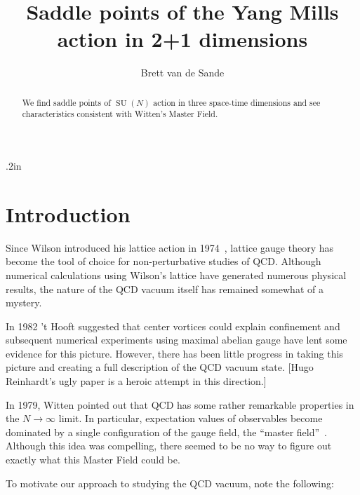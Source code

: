 \documentclass[preprint,aps,prd]{revtex4-2}
\DeclareMathOperator{\SU}{SU}
\begin{document}
\title{Saddle points of the Yang Mills action in 2+1 dimensions}


\author{Brett van de Sande}
\noaffiliation

\begin{abstract}
  We find saddle points of $\SU(N)$ action in three space-time dimensions
  and see characteristics consistent with Witten's Master Field.
\end{abstract}

\maketitle

\baselineskip .2in

\section{Introduction}
\label{intro}

Since Wilson introduced his lattice action in 1974~\cite{wilson_confinement_1974},
lattice gauge theory has become the tool of choice for
non-perturbative studies of QCD.  Although numerical
calculations using Wilson's lattice have generated numerous
physical results, the nature of the QCD vacuum itself
has remained somewhat of a mystery.

In 1982 't Hooft suggested that center vortices could
explain confinement and subsequent numerical experiments
using maximal abelian gauge have lent some evidence for this
picture.  However, there has been little progress in taking
this picture and creating a full description of the
QCD vacuum state.  [Hugo Reinhardt's ugly paper is a
  heroic attempt in this direction.]

In 1979, Witten pointed out that QCD has some rather remarkable
properties in the $N \to \infty$ limit.  In particular,
expectation values of observables become dominated by a single
configuration of the gauge field, the
``master field''~\cite{witten_1/n_1980}.
Although this idea was compelling, there seemed to be no
way to figure out exactly what this Master Field could be.

To motivate our approach to studying the QCD vacuum, note the following:
\end{document}
